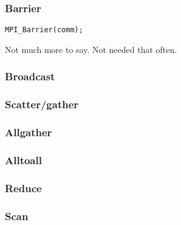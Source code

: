 \documentclass{beamer}
\begin{document}
\begin{frame}[fragile]
  \frametitle{Barrier}

\begin{verbatim}
MPI_Barrier(comm);
\end{verbatim}

Not much more to say.  Not needed that often.

\end{frame}


\begin{frame}
  \frametitle{Broadcast}

  \begin{center}
    
  \end{center}
\end{frame}


\begin{frame}
  \frametitle{Scatter/gather}

  \begin{center}
    
  \end{center}

\end{frame}


\begin{frame}
  \frametitle{Allgather}

  \begin{center}
    
  \end{center}

\end{frame}


\begin{frame}
  \frametitle{Alltoall}

  \begin{center}
    
  \end{center}

\end{frame}


\begin{frame}
  \frametitle{Reduce}

  \begin{center}
    
  \end{center}

\end{frame}


\begin{frame}
  \frametitle{Scan}

  \begin{center}
    
  \end{center}

\end{frame}
\end{document}
